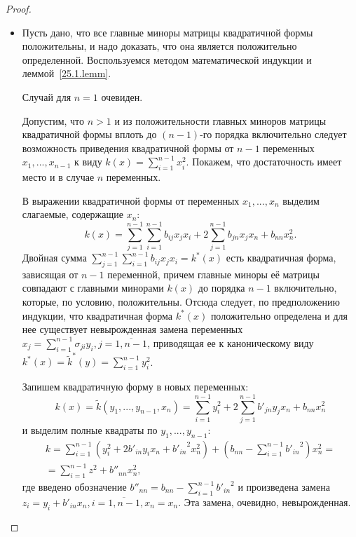   \begin{proof} \leavevmode
  \begin{itemize}[wide, labelwidth=!, labelindent=\parindent]
  \item[\fbox{дост.:}] Пусть дано, что все главные миноры матрицы квадратичной формы положительны, и надо доказать, что она является положительно определенной. Воспользуемся методом математической индукции и леммой~\ref{25.1.lemm}. 

  Случай для \underline{$n=1$} очевиден. 
  
  Допустим, что \underline{$n>1$} и из положительности главных миноров матрицы квадратичной формы вплоть до $(n-1)$-го порядка включительно следует возможность приведения квадратичной формы от $n-1$ переменных $x_1,...,x_{n-1}$ к виду $k(x)=\sum\limits_{i=1}^{n-1}x_i^2$. Покажем, что достаточность имеет место и в случае $n$ переменных.
  
  В выражении квадратичной формы от переменных $x_1,...,x_n$ выделим слагаемые, содержащие $x_n$:
  \begin{equation*}
  k(x)=\sum_{j=1}^{n-1}\sum_{i=1}^{n-1}b_{ij}x_jx_i+2\sum_{j=1}^{n-1}b_{jn}x_jx_n+b_{nn}x_n^2.
  \end{equation*}
  Двойная сумма $\sum\limits_{j=1}^{n-1}\sum\limits_{i=1}^{n-1}b_{ij}x_jx_i=k^*(x)$ есть квадратичная форма, зависящая от $n-1$ переменной, причем главные миноры её матрицы совпадают с главными минорами $k(x)$ до порядка $n-1$ включительно, которые, по условию, положительны. Отсюда следует, по предположению индукции, что квадратичная форма $k^*(x)$ положительно определена и для нее существует невырожденная замена переменных $x_j=\sum\limits_{i=1}^{n-1}\sigma_{ji}y_i, j=\overline{1,n-1}$, приводящая ее к каноническому виду $k^*(x)=\widetilde k^*(y)=\sum\limits_{i=1}^{n-1}y_i^2$.
  
  Запишем квадратичную форму в новых переменных:
  \begin{equation*}
  k(x)=\widetilde k(y_1,...,y_{n-1},x_n)=\sum\limits_{i=1}^{n-1}y_i^2+2\sum_{j=1}^{n-1}b'_{jn}y_jx_n+b_{nn}x_n^2
  \end{equation*}
и выделим полные квадраты по $y_1,...,y_{n-1}$:
  \begin{equation*}\begin{array}{crl}
  k=\sum\limits_{i=1}^{n-1}(y_i^2+2b'_{in}y_ix_n+{b'_{in}}^2x_n^2)+(b_{nn}-\sum\limits_{i=1}^{n-1}{b'_{in}}^2)x_n^2 =\\
  =\sum\limits_{i=1}^{n-1}z^2+b''_{nn}x_n^2,
  \end{array}\end{equation*}
где введено обозначение $ b''_{nn}=b_{nn}-\sum\limits_{i=1}^{n-1}{b'_{in}}^2 $ и произведена замена $z_i=y_i+b'_{in}x_n, i=\overline{1,n-1}, x_n=x_n$. Эта замена, очевидно, невырожденная.


\end{itemize}
\end{proof}
